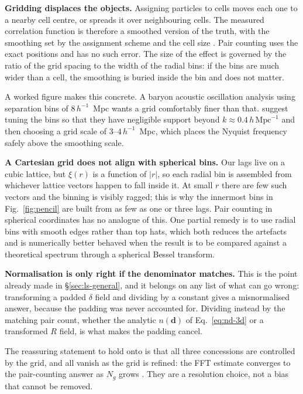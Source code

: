 \documentclass[12pt]{article}
\newcommand{\bd}{\mathbf{d}}
\begin{document}
\textbf{Gridding displaces the objects.} Assigning particles to cells moves
each one to a nearby cell centre, or spreads it over neighbouring cells.  The
measured correlation function is therefore a smoothed version of the truth,
with the smoothing set by the assignment scheme and the cell size
\citep{Jing2005}.  Pair counting uses the exact positions and has no such
error.  The size of the effect is governed by the ratio of the grid spacing to
the width of the radial bins: if the bins are much wider than a cell, the
smoothing is buried inside the bin and does not matter.

A worked figure makes this concrete.  A baryon acoustic oscillation analysis
using separation bins of $8\,h^{-1}$~Mpc wants a grid comfortably finer than
that.  \citet{Slepian2016} suggest tuning the bins so that they have
negligible support beyond $k \approx 0.4\,h\,\mathrm{Mpc}^{-1}$ and then
choosing a grid scale of $3$--$4\,h^{-1}$~Mpc, which places the Nyquist
frequency safely above the smoothing scale.

\textbf{A Cartesian grid does not align with spherical bins.} Our lags live
on a cubic lattice, but $\xi(r)$ is a function of $|r|$, so each radial bin
is assembled from whichever lattice vectors happen to fall inside it.  At
small $r$ there are few such vectors and the binning is visibly ragged; this
is why the innermost bins in Fig.~\ref{fig:pencil} are built from as few as
one or three lags.  Pair counting in spherical coordinates has no analogue of
this.  One partial remedy is to use radial bins with smooth edges rather than
top hats, which both reduces the artefacts and is numerically better behaved
when the result is to be compared against a theoretical spectrum through a
spherical Bessel transform.

\textbf{Normalisation is only right if the denominator matches.} This is the
point already made in \S\ref{sec:ls-general}, and it belongs on any list of
what can go wrong: transforming a padded $\delta$ field and dividing by a
constant gives a misnormalised answer, because the padding was never
accounted for.  Dividing instead by the matching pair count, whether the
analytic $n(\bd)$ of Eq.~\eqref{eq:nd-3d} or a transformed $R$ field,
is what makes the padding cancel.

The reassuring statement to hold onto is that all three concessions are
controlled by the grid, and all vanish as the grid is refined: the FFT
estimate converges to the pair-counting answer as $N_g$ grows
\citep{Slepian2016}.  They are a resolution choice, not a bias that cannot be
removed.
\end{document}
